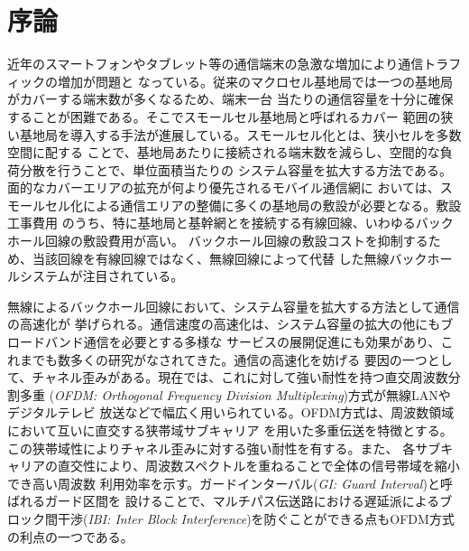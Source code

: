 \chapter{序論}

近年のスマートフォンやタブレット等の通信端末の急激な増加により通信トラフィックの増加が問題と
なっている。従来のマクロセル基地局では一つの基地局がカバーする端末数が多くなるため、端末一台
当たりの通信容量を十分に確保することが困難である。そこでスモールセル基地局と呼ばれるカバー
範囲の狭い基地局を導入する手法が進展している。スモールセル化とは、狭小セルを多数空間に配する
ことで、基地局あたりに接続される端末数を減らし、空間的な負荷分散を行うことで、単位面積当たりの
システム容量を拡大する方法である。面的なカバーエリアの拡充が何より優先されるモバイル通信網に
おいては、スモールセル化による通信エリアの整備に多くの基地局の敷設が必要となる。敷設工事費用
のうち、特に基地局と基幹網とを接続する有線回線、いわゆるバックホール回線の敷設費用が高い。
バックホール回線の敷設コストを抑制するため、当該回線を有線回線ではなく、無線回線によって代替
した無線バックホールシステムが注目されている。\cite{yamo} \cite{pabst}

無線によるバックホール回線において、システム容量を拡大する方法として通信の高速化が
挙げられる。通信速度の高速化は、システム容量の拡大の他にもブロードバンド通信を必要とする多様な
サービスの展開促進にも効果があり、これまでも数多くの研究がなされてきた。通信の高速化を妨げる
要因の一つとして、チャネル歪みがある。現在では、これに対して強い耐性を持つ直交周波数分割多重
(\emph{OFDM: Orthogonal Frequency Division Multiplexing})方式が無線LANやデジタルテレビ
放送などで幅広く用いられている。OFDM方式は、周波数領域において互いに直交する狭帯域サブキャリア
を用いた多重伝送を特徴とする。この狭帯域性によりチャネル歪みに対する強い耐性を有する。また、
各サブキャリアの直交性により、周波数スペクトルを重ねることで全体の信号帯域を縮小でき高い周波数
利用効率を示す。ガードインターバル(\emph{GI: Guard Interval})と呼ばれるガード区間を
設けることで、マルチパス伝送路における遅延派によるブロック間干渉(\emph{IBI: Inter Block
Interference})を防ぐことができる点もOFDM方式の利点の一つである。

